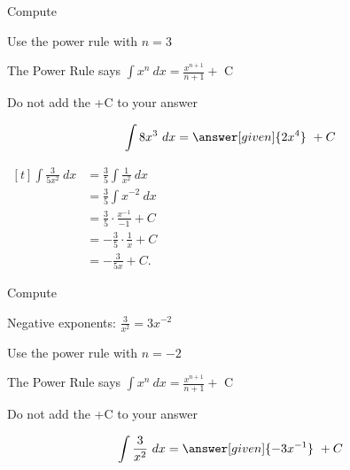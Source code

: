 \documentclass{ximera}
\begin{document}
\begin{problem} %
Compute 

\begin{hint}
Use the power rule with $n=3$
\end{hint}
\begin{hint}
The Power Rule says $\int x^n \ dx = \frac{x^{n+1}}{n+1} +$ C
\end{hint}
\begin{hint}
\begin{center}
Do not add the +C to your answer
\end{center}
\end{hint}

\[
\int 8x^3 \ dx =
\answer[given]{2x^4} \ + C
\]
\end{problem}


\begin{example} %
$\begin{aligned}[t]
\int \frac{3}{5x^2} \ dx &= \frac{3}{5} \int \frac{1}{x^2} \ dx \\[3pt]
&=\frac{3}{5} \int x^{-2} \ dx \\[3pt]
&= \frac{3}{5} \cdot \frac{x^{-1}}{-1} +C \\[5pt]
&= -\frac{3}{5} \cdot \frac{1}{x} +C \\[5pt]
&= -\frac{3}{5x} +C.
\end{aligned}$
\end{example}


\begin{problem} %
Compute 

\begin{hint}
Negative exponents: $\frac{3}{x^2} = 3x^{-2}$
\end{hint}
\begin{hint}
Use the power rule with $n=-2$
\end{hint}
\begin{hint}
The Power Rule says $\int x^n \ dx = \frac{x^{n+1}}{n+1} +$ C
\end{hint}
\begin{hint}
\begin{center}
Do not add the +C to your answer
\end{center}
\end{hint}

\[
\int \frac{3}{x^2} \ dx =
\answer[given]{-3x^{-1}} \ + C
\]
\end{problem}
\end{document}
